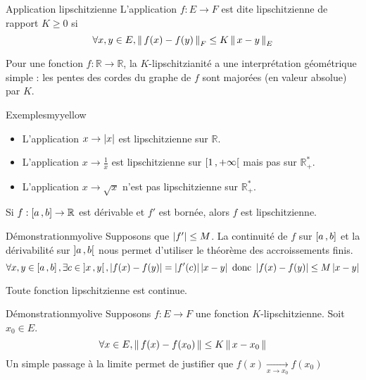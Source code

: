     \begin{defi}{Application lipschitzienne}{}
        L’application $f : E \rightarrow F$ est dite lipschitzienne de rapport $K \geq 0$ si 
        \[ \forall x,y \in E, \left\lVert\,f(x) - f(y)\,\right\rVert_F \leq K \left\lVert\,x-y\,\right\rVert_E \] 
    \end{defi}

    Pour une fonction $f: \mathbb{R} \rightarrow \mathbb{R}$, la $K$-lipschitzianité a une interprétation géométrique simple : les pentes des cordes du graphe de $f$ sont majorées (en valeur absolue) par $K$.

    \begin{omed}{Exemples}{myyellow}
        \begin{itemize}
            \item L’application $x \rightarrow \left\lvert x\right\rvert$ est lipschitzienne sur $\mathbb{R}$.
            \item L’application $x \rightarrow \frac{1}{x}$ est lipschitzienne sur $\left[ 1 \, , +\infty \right[$ mais pas sur $\mathbb{R}_+^*$.
            \item L’application $x \rightarrow \sqrt{x}$ n’est pas lipschitzienne sur $\mathbb{R}_+^*$.
        \end{itemize}
    \end{omed}

    \begin{prop}{}{}
        Si $f : \left[ a \, , b \right] \rightarrow \mathbb{R}$ est dérivable et $f'$ est bornée, alors $f$ est lipschitzienne.
    \end{prop}

    \begin{demo}{Démonstration}{myolive}
        Supposons que $\left\lvert f'\right\rvert \leq M$. La continuité de $f$ sur $\left[ a \, , b \right]$ et la dérivabilité sur $\left] a \, , b \right[$  nous permet d’utiliser le théorème des accroissements finis.
        \[ \forall x,y \in \left[ a \, , b \right], \exists c \in \left] x \, , y \right[, \left\lvert f(x)-f(y)\right\rvert = \left\lvert f'(c)\right\rvert\left\lvert x-y\right\rvert \text{ donc } \left\lvert f(x) - f(y)\right\rvert \leq M \left\lvert x-y\right\rvert \] 
    \end{demo}

    \begin{prop}{}{}
        Toute fonction lipschitzienne est continue.
    \end{prop}

    \begin{demo}{Démonstration}{myolive}
        Supposons $f : E \rightarrow F$ une fonction $K$-lipschitzienne. Soit $x_0 \in E$.
        \[ \forall x \in E, \left\lVert\,f(x)-f(x_0)\,\right\rVert \leq K \left\lVert\,x - x_0\,\right\rVert \] 
        Un simple passage à la limite permet de justifier que $f(x) \underset{x \rightarrow x_0}{\longrightarrow} f(x_0)$
    \end{demo}


